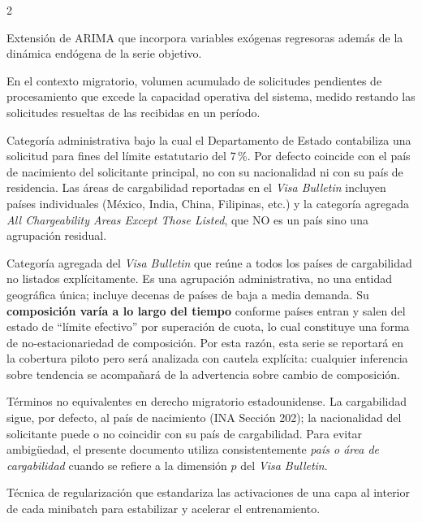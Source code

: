 \documentclass[12pt,letterpaper]{report}
\begin{document}
\begin{multicols}{2}
\begin{description}[leftmargin=0pt, labelindent=0pt, itemindent=0pt,
                    labelsep=0.4em, font=\bfseries\scriptsize,
                    itemsep=2pt, parsep=0pt, topsep=0pt]
    \item[ARIMAX] Extensión de ARIMA que incorpora variables exógenas regresoras además de la dinámica endógena de la serie objetivo.

    \item[Backlog (neto)] En el contexto migratorio, volumen acumulado de solicitudes pendientes de procesamiento que excede la capacidad operativa del sistema, medido restando las solicitudes resueltas de las recibidas en un período.

    \item[País de cargabilidad (\textit{chargeability area})] Categoría administrativa bajo la cual el Departamento de Estado contabiliza una solicitud para fines del límite estatutario del 7\,\%. Por defecto coincide con el país de nacimiento del solicitante principal, no con su nacionalidad ni con su país de residencia. Las áreas de cargabilidad reportadas en el \textit{Visa Bulletin} incluyen países individuales (México, India, China, Filipinas, etc.) y la categoría agregada \textit{All Chargeability Areas Except Those Listed}, que NO es un país sino una agrupación residual.

    \item[All Chargeability Areas Except Those Listed] Categoría agregada del \textit{Visa Bulletin} que reúne a todos los países de cargabilidad no listados explícitamente. Es una agrupación administrativa, no una entidad geográfica única; incluye decenas de países de baja a media demanda. Su \textbf{composición varía a lo largo del tiempo} conforme países entran y salen del estado de ``límite efectivo'' por superación de cuota, lo cual constituye una forma de no-estacionariedad de composición. Por esta razón, esta serie se reportará en la cobertura piloto pero será analizada con cautela explícita: cualquier inferencia sobre tendencia se acompañará de la advertencia sobre cambio de composición.

    \item[Nacionalidad vs. país de cargabilidad] Términos no equivalentes en derecho migratorio estadounidense. La cargabilidad sigue, por defecto, al país de nacimiento (INA Sección 202); la nacionalidad del solicitante puede o no coincidir con su país de cargabilidad. Para evitar ambigüedad, el presente documento utiliza consistentemente \textit{país o área de cargabilidad} cuando se refiere a la dimensión $p$ del \textit{Visa Bulletin}.

    \item[Batch Normalization] Técnica de regularización que estandariza las activaciones de una capa al interior de cada minibatch para estabilizar y acelerar el entrenamiento.


\end{description}
\end{multicols}
\end{document}
